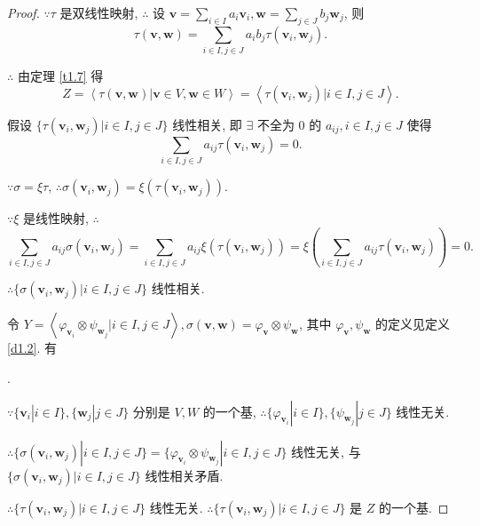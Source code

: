 \documentclass[color=black,device=normal,lang=cn,mode=geye]{elegantnote}
\begin{document}
\begin{proof}
    $\because\tau$ 是双线性映射, $\therefore$ 设 $\boldsymbol{v}=\sum\limits_{i\in I}a_i\boldsymbol{v}_i,\boldsymbol{w}=\sum\limits_{j\in J}b_j\boldsymbol{w}_j$, 则
    \[\tau(\boldsymbol{v},\boldsymbol{w})=\sum\limits_{i\in I,j\in J}a_ib_j\tau(\boldsymbol{v}_i,\boldsymbol{w}_j).\]
    
    $\therefore$ 由定理 \ref{t1.7} 得
    \[Z=\left<\tau(\boldsymbol{v},\boldsymbol{w})|\boldsymbol{v}\in V,\boldsymbol{w}\in W\right>=\left<\tau(\boldsymbol{v}_i,\boldsymbol{w}_j)|i\in I,j\in J\right>.\]

    假设 $\{\tau(\boldsymbol{v}_i,\boldsymbol{w}_j)|i\in I,j\in J\}$ 线性相关, 即 $\exists$ 不全为 $0$ 的 $a_{ij},i\in I,j\in J$ 使得
    \[\sum\limits_{i\in I,j\in J}a_{ij}\tau(\boldsymbol{v}_i,\boldsymbol{w}_j)=0.\]

    $\because\sigma=\xi\tau$, $\therefore\sigma(\boldsymbol{v}_i,\boldsymbol{w}_j)=\xi(\tau(\boldsymbol{v}_i,\boldsymbol{w}_j))$.

    $\because\xi$ 是线性映射, $\therefore$
    \[\sum\limits_{i\in I,j\in J}a_{ij}\sigma(\boldsymbol{v}_i,\boldsymbol{w}_j)=\sum\limits_{i\in I,j\in J}a_{ij}\xi(\tau(\boldsymbol{v}_i,\boldsymbol{w}_j))=\xi\left(\sum\limits_{i\in I,j\in J}a_{ij}\tau(\boldsymbol{v}_i,\boldsymbol{w}_j)\right)=0.\]

    $\therefore\{\sigma(\boldsymbol{v}_i,\boldsymbol{w}_j)|i\in I,j\in J\}$ 线性相关.
    
    令 $Y=\left<\varphi_{\boldsymbol{v}_i}\otimes\psi_{\boldsymbol{w}_j}|i\in I,j\in J\right>,\sigma(\boldsymbol{v},\boldsymbol{w})=\varphi_{\boldsymbol{v}}\otimes\psi_{\boldsymbol{w}}$, 其中 $\varphi_{\boldsymbol{v}},\psi_{\boldsymbol{w}}$ 的定义见定义 \ref{d1.2}. 有
    \begin{center}
        .
    \end{center}

    $\because\{\boldsymbol{v}_i|i\in I\},\{\boldsymbol{w}_j|j\in J\}$ 分别是 $V,W$ 的一个基, $\therefore\{\varphi_{\boldsymbol{v}_i}|i\in I\},\{\psi_{\boldsymbol{w}_j}|j\in J\}$ 线性无关.
    
    $\therefore\{\sigma(\boldsymbol{v}_i,\boldsymbol{w}_j)|i\in I,j\in J\}=\{\varphi_{\boldsymbol{v}_i}\otimes\psi_{\boldsymbol{w}_j}|i\in I,j\in J\}$ 线性无关, 与 $\{\sigma(\boldsymbol{v}_i,\boldsymbol{w}_j)|i\in I,j\in J\}$ 线性相关矛盾.

    $\therefore\{\tau(\boldsymbol{v}_i,\boldsymbol{w}_j)|i\in I,j\in J\}$ 线性无关. $\therefore\{\tau(\boldsymbol{v}_i,\boldsymbol{w}_j)|i\in I,j\in J\}$ 是 $Z$ 的一个基.
\end{proof}
\end{document}
